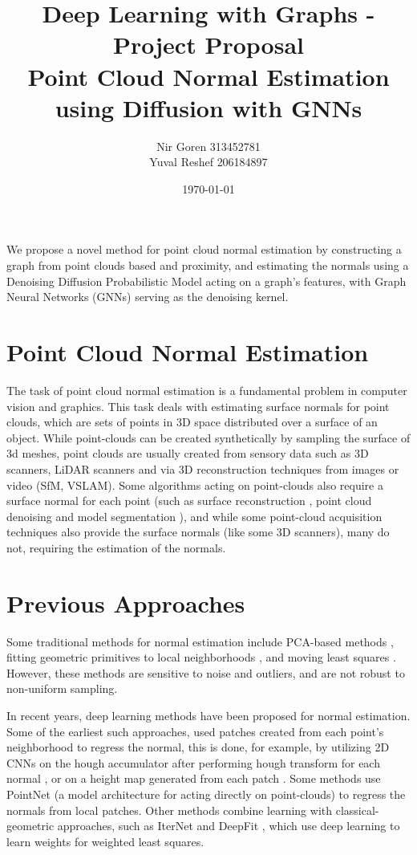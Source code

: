 \documentclass{article}
\title{Deep Learning with Graphs - Project Proposal 
\\{ \large Point Cloud Normal Estimation using Diffusion with GNNs}}
\author{Nir Goren 313452781 \\ Yuval Reshef 206184897}
\date{\today}
\begin{document}
\maketitle

We propose a novel method for point cloud normal estimation by constructing a graph from point clouds based and proximity, and estimating the normals using a Denoising Diffusion Probabilistic Model acting on a graph's features, with Graph Neural Networks (GNNs) serving as the denoising kernel.

\section{Point Cloud Normal Estimation}
The task of point cloud normal estimation is a fundamental problem in computer vision and graphics. This task deals with estimating surface normals for point clouds, which are sets of points in 3D space distributed over a surface of an object. While point-clouds can be created synthetically by sampling the surface of 3d meshes, point clouds are usually created from sensory data such as 3D scanners, LiDAR scanners and via 3D reconstruction techniques from images or video (SfM, VSLAM). Some algorithms acting on point-clouds also require a surface normal for each point (such as surface reconstruction \cite{kazhdan2006poisson, fleishman2005robust}, point cloud denoising \cite{lu2020low} and model segmentation \cite{che2018multi}), and while some point-cloud acquisition techniques also provide the surface normals (like some 3D scanners), many do not, requiring the estimation of the normals.

\section{Previous Approaches}
Some traditional methods for normal estimation include PCA-based methods \cite{alliez2007voronoi,dey2006normal,hoppe1992surface}, fitting geometric primitives to local neighborhoods \cite{cazals2005estimating,guennebaud2007algebraic}, and moving least squares \cite{levin1998approximation}. However, these methods are sensitive to noise and outliers, and are not robust to non-uniform sampling.

In recent years, deep learning methods have been proposed for normal estimation.
Some of the earliest such approaches, used patches created from each point's neighborhood to regress the normal, this is done, for example, by utilizing 2D CNNs on the hough accumulator after performing hough transform for each normal \cite{boulch2016deep}, or on a height map generated from each patch \cite{roveri2018pointpronets,zhou2022refine}. Some methods \cite{guerrero2018pcpnet,sharma2021point} use PointNet \cite{qi2017pointnet} (a model architecture for acting directly on point-clouds) to regress the normals from local patches. Other methods combine learning with classical-geometric approaches, such as IterNet \cite{lenssen2020deep} and DeepFit \cite{ben2020deepfit}, which use deep learning to learn weights for weighted least squares. 
\end{document}
